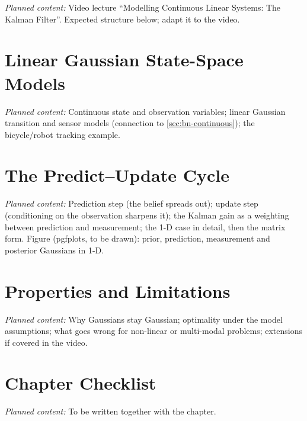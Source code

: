 \documentclass[11pt, oneside]{book}
\newcommand{\planned}[1]{%
  \par{\small\color{gray!70!black}\textit{Planned content:} #1}\par}
\let\originalsection\section
\renewcommand{\section}{\Needspace{7\baselineskip}\originalsection}
\begin{document}
\planned{Video lecture ``Modelling Continuous Linear Systems: The Kalman
Filter''. Expected structure below; adapt it to the video.}

\section{Linear Gaussian State-Space Models}
\planned{Continuous state and observation variables; linear Gaussian
transition and sensor models (connection to \cref{sec:bn-continuous});
the bicycle/robot tracking example.}

\section{The Predict--Update Cycle}
\planned{Prediction step (the belief spreads out); update step (conditioning
on the observation sharpens it); the Kalman gain as a weighting between
prediction and measurement; the 1-D case in detail, then the matrix form.
Figure (pgfplots, to be drawn): prior, prediction, measurement and posterior
Gaussians in 1-D.}

\section{Properties and Limitations}
\planned{Why Gaussians stay Gaussian; optimality under the model assumptions;
what goes wrong for non-linear or multi-modal problems; extensions if covered
in the video.}

\section{Chapter Checklist}
\planned{To be written together with the chapter.}
\end{document}
